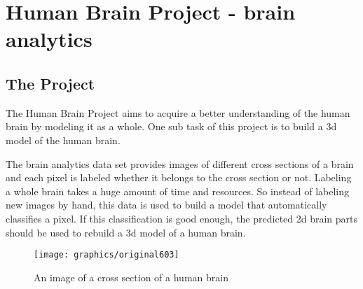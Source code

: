 %

\section{Human Brain Project - brain analytics}


\subsection{The Project}

The Human Brain Project aims to acquire a better understanding of
the human brain by modeling it as a whole. One sub task of this project
is to build a 3d model of the human brain.

The brain analytics data set provides images of different cross sections
of a brain and each pixel is labeled whether it belongs to the cross
section or not. Labeling a whole brain takes a huge amount of time
and resources. So instead of labeling new images by hand, this data
is used to build a model that automatically classifies a pixel. If
this classification is good enough, the predicted 2d brain parts should
be used to rebuild a 3d model of a human brain. 

\begin{figure}[h] \centering \texttt{[image: graphics/original603]} \caption{An image of a cross section of a human brain} \label{fig:original603} \end{figure}%

